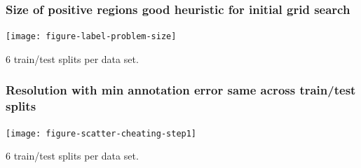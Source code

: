 \documentclass{beamer}
\begin{document}
\begin{frame}
  \frametitle{Size of positive regions good heuristic for initial grid search}

  \texttt{[image: figure-label-problem-size]}

  6 train/test splits per data set.
\end{frame}

\begin{frame}
  \frametitle{Resolution with min annotation error same across
    train/test splits}

  \texttt{[image: figure-scatter-cheating-step1]}

  6 train/test splits per data set.
\end{frame}
\end{document}
